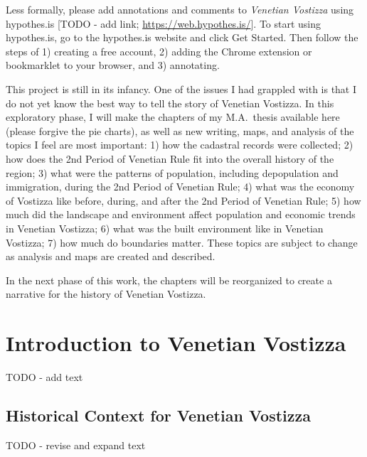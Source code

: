 \documentclass[english,]{book}
\begin{document}
Less formally, please add annotations and comments to \emph{Venetian Vostizza} using hypothes.is {[}TODO - add link; \url{https://web.hypothes.is/}{]}. To start using hypothes.is, go to the hypothes.is website and click Get Started. Then follow the steps of 1) creating a free account, 2) adding the Chrome extension or bookmarklet to your browser, and 3) annotating.

This project is still in its infancy. One of the issues I had grappled with is that I do not yet know the best way to tell the story of Venetian Vostizza. In this exploratory phase, I will make the chapters of my M.A.~thesis available here (please forgive the pie charts), as well as new writing, maps, and analysis of the topics I feel are most important: 1) how the cadastral records were collected; 2) how does the 2nd Period of Venetian Rule fit into the overall history of the region; 3) what were the patterns of population, including depopulation and immigration, during the 2nd Period of Venetian Rule; 4) what was the economy of Vostizza like before, during, and after the 2nd Period of Venetian Rule; 5) how much did the landscape and environment affect population and economic trends in Venetian Vostizza; 6) what was the built environment like in Venetian Vostizza; 7) how much do boundaries matter. These topics are subject to change as analysis and maps are created and described.

In the next phase of this work, the chapters will be reorganized to create a narrative for the history of Venetian Vostizza.

\hypertarget{introduction}{%
\chapter{Introduction to Venetian Vostizza}\label{introduction}}

TODO - add text

\hypertarget{history}{%
\section{Historical Context for Venetian Vostizza}\label{history}}

TODO - revise and expand text
\end{document}
